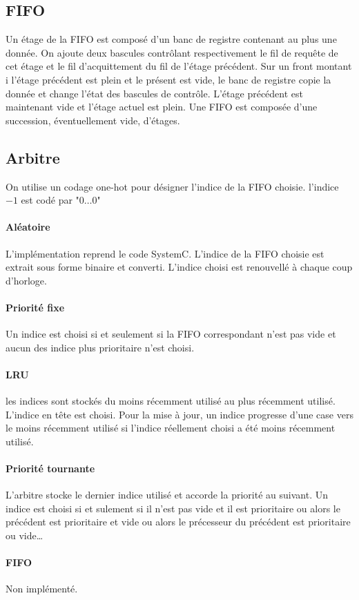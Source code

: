 \documentclass[11pt]{article}
\begin{document}
\subsection{FIFO}
Un étage de la FIFO est composé d'un banc de registre contenant au plus une donnée. On ajoute deux bascules contrôlant respectivement le fil de requête de cet étage et le fil d'acquittement du fil de l'étage précédent. Sur un front montant i l'étage précédent est plein et le présent est vide, le banc de registre copie la donnée et change l'état des bascules de contrôle. L'étage précédent est maintenant vide et l'étage actuel est plein.
Une FIFO est composée d'une succession, éventuellement vide, d'étages.

\subsection{Arbitre}
On utilise un codage one-hot pour désigner l'indice de la FIFO choisie. l'indice $-1$ est codé par "$0\dots0$"
\paragraph{Aléatoire}
L'implémentation reprend le code SystemC. L'indice de la FIFO choisie est extrait sous forme binaire et converti. L'indice choisi est renouvellé à chaque coup d'horloge.
\paragraph{Priorité fixe}
Un indice est choisi si et seulement si la FIFO correspondant n'est pas vide et aucun des indice plus prioritaire n'est choisi.
\paragraph{LRU}
les indices sont stockés du moins récemment utilisé au plus récemment utilisé. L'indice en tête est choisi. Pour la mise à jour, un indice progresse d'une case vers le moins récemment utilisé si l'indice réellement choisi a été moins récemment utilisé.
\paragraph{Priorité tournante}
L'arbitre stocke le dernier indice utilisé et accorde la priorité au suivant. Un indice est choisi si et sulement si il n'est pas vide et il est prioritaire ou alors le précédent est prioritaire et vide ou alors le précesseur du précédent est prioritaire ou vide\ldots
\paragraph{FIFO} Non implémenté.
\end{document}
